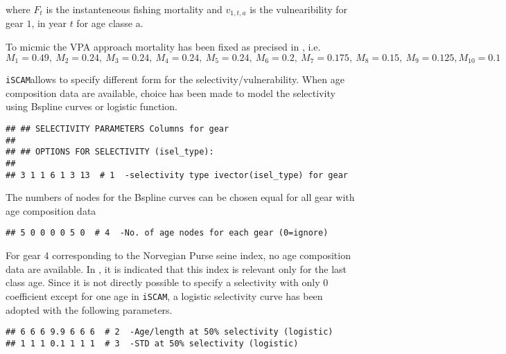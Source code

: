 \documentclass[a4paper]{article}\usepackage{graphicx, color}
\makeatletter
\newenvironment{kframe}{%
 \def\at@end@of@kframe{}%
 \ifinner\ifhmode%
  \def\at@end@of@kframe{\end{minipage}}%
  \begin{minipage}{\columnwidth}%
 \fi\fi%
 \def\FrameCommand##1{\hskip\@totalleftmargin \hskip-\fboxsep
 \colorbox{shadecolor}{##1}\hskip-\fboxsep
     \hskip-\linewidth \hskip-\@totalleftmargin \hskip\columnwidth}%
 \MakeFramed {\advance\hsize-\width
   \@totalleftmargin\z@ \linewidth\hsize
   \@setminipage}}%
 {\par\unskip\endMakeFramed%
 \at@end@of@kframe}
\newenvironment{knitrout}{}{} %
\newcommand{\iscam}{\texttt{iSCAM}}
\makeatother
\begin{document}
where $F_t$ is the instanteneous  fishing mortality and $v_{1,t,a}$ is
the vulnearibility for gear $1$, in year $t$ for age classe a.


To micmic  the VPA approach  mortality has  been fixed as  precised in
\cite{tuna2012}, i.e.
$$M_1=0.49, \ M_2=0.24, \ M_3=0.24, \ M_4=0.24, \ M_5=0.24,\ M_6=0.2, \
M_7=0.175, \ M_8=0.15,\ M_9=0.125, M_{10}=0.1$$

\iscam    allows     to    specify    different    form     for    the
selectivity/vulnerability.  When  age composition data  are available,
choice has been made to model  the selectivity using Bspline curves or
logistic function.
\begin{knitrout}
\color{fgcolor}\begin{kframe}
\begin{verbatim}
## ## SELECTIVITY PARAMETERS Columns for gear                                   ##
## ## OPTIONS FOR SELECTIVITY (isel_type):                                      ##
## 3 1 1 6 1 3 13  # 1  -selectivity type ivector(isel_type) for gear
\end{verbatim}
\end{kframe}
\end{knitrout}




The numbers  of nodes for the  Bspline curves can be  chosen equal for
all gear with age composition data 

\begin{knitrout}
\color{fgcolor}\begin{kframe}
\begin{verbatim}
## 5 0 0 0 0 5 0  # 4  -No. of age nodes for each gear (0=ignore)
\end{verbatim}
\end{kframe}
\end{knitrout}


For gear  4 corresponding to the  Norvegian Purse seine index,  no age
composition data  are available.  In \cite{tuna2012}, it  is indicated
that this index is  relevant only for the last class  age. Since it is
not  directly   possible  to  specify   a  selectivity  with   only  0
coefficient except for one age in \iscam, a logistic selectivity curve has been
adopted with the following parameters.
\begin{knitrout}
\color{fgcolor}\begin{kframe}
\begin{verbatim}
## 6 6 6 9.9 6 6 6  # 2  -Age/length at 50% selectivity (logistic)
## 1 1 1 0.1 1 1 1  # 3  -STD at 50% selectivity (logistic)
\end{verbatim}
\end{kframe}
\end{knitrout}
\end{document}

